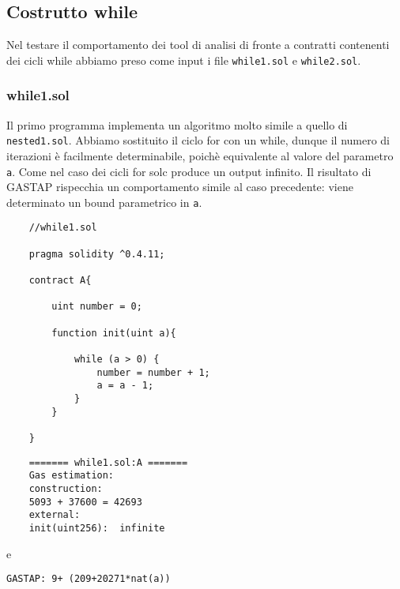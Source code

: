     \subsection{Costrutto while}
    
    Nel testare il comportamento dei tool di analisi di fronte a contratti contenenti dei cicli while abbiamo preso come input i file \verb|while1.sol| e \verb|while2.sol|.\newline
    
    \subsubsection{while1.sol}
    
    \indent Il primo programma implementa un algoritmo molto simile a quello di \verb|nested1.sol|. Abbiamo sostituito il ciclo for con un while, dunque il numero di iterazioni è facilmente determinabile, poichè equivalente al valore del parametro \verb|a|. Come nel caso dei cicli for solc produce un output infinito. Il risultato di GASTAP rispecchia un comportamento simile al caso precedente: viene determinato un bound parametrico in \verb|a|.\newline
    
    \begin{minipage}{\linewidth}
    \begin{lstlisting}
    //while1.sol

    pragma solidity ^0.4.11;

    contract A{

        uint number = 0;

        function init(uint a){
            
            while (a > 0) {
                number = number + 1;
                a = a - 1;
            }
        }

    }
    \end{lstlisting}
    \end{minipage}
    
    \begin{minipage}{\linewidth}
    \begin{lstlisting}
    ======= while1.sol:A =======
    Gas estimation:
    construction:
    5093 + 37600 = 42693
    external:
    init(uint256):	infinite
    \end{lstlisting}
    \end{minipage}

    
    e
    
    \verb|GASTAP: 9+ (209+20271*nat(a))|
    
